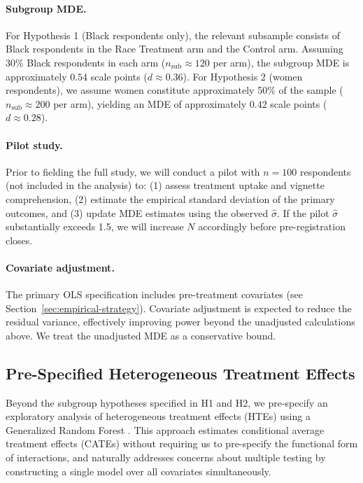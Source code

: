 \paragraph{Subgroup MDE.}
For Hypothesis 1 (Black respondents only), the relevant subsample consists of Black respondents in the Race Treatment arm and the Control arm.
Assuming 30\% Black respondents in each arm ($n_{\text{sub}} \approx 120$ per arm), the subgroup MDE is approximately $0.54$ scale points ($d \approx 0.36$).
For Hypothesis 2 (women respondents), we assume women constitute approximately 50\% of the sample ($n_{\text{sub}} \approx 200$ per arm), yielding an MDE of approximately $0.42$ scale points ($d \approx 0.28$).

\paragraph{Pilot study.}
Prior to fielding the full study, we will conduct a pilot with $n = 100$ respondents (not included in the analysis) to: (1) assess treatment uptake and vignette comprehension, (2) estimate the empirical standard deviation of the primary outcomes, and (3) update MDE estimates using the observed $\hat{\sigma}$.
If the pilot $\hat{\sigma}$ substantially exceeds 1.5, we will increase $N$ accordingly before pre-registration closes.

\paragraph{Covariate adjustment.}
The primary OLS specification includes pre-treatment covariates (see Section~\ref{sec:empirical-strategy}).
Covariate adjustment is expected to reduce the residual variance, effectively improving power beyond the unadjusted calculations above.
We treat the unadjusted MDE as a conservative bound.

\subsection{Pre-Specified Heterogeneous Treatment Effects}
\label{sec:hte}

Beyond the subgroup hypotheses specified in H1 and H2, we pre-specify an exploratory analysis of heterogeneous treatment effects (HTEs) using a Generalized Random Forest \citep[GRF;][]{Athey2019}.
This approach estimates conditional average treatment effects (CATEs) without requiring us to pre-specify the functional form of interactions, and naturally addresses concerns about multiple testing by constructing a single model over all covariates simultaneously.

